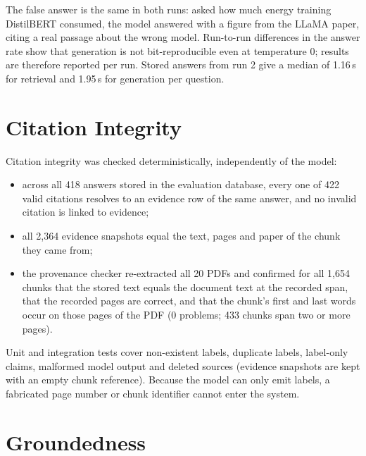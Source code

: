 The false answer is the same in both runs: asked how much energy training DistilBERT consumed, the model answered
with a figure from the LLaMA paper, citing a real passage about the wrong model. Run-to-run differences in the
answer rate show that generation is not bit-reproducible even at temperature 0; results are therefore reported per
run. Stored answers from run 2 give a median of 1.16\,s for retrieval and 1.95\,s for generation per question.

\section{Citation Integrity}

Citation integrity was checked deterministically, independently of the model:
\begin{itemize}
  \item across all 418 answers stored in the evaluation database, every one of 422 valid citations resolves to an
        evidence row of the same answer, and no invalid citation is linked to evidence;
  \item all 2{,}364 evidence snapshots equal the text, pages and paper of the chunk they came from;
  \item the provenance checker re-extracted all 20 PDFs and confirmed for all 1{,}654 chunks that the stored text
        equals the document text at the recorded span, that the recorded pages are correct, and that the chunk's
        first and last words occur on those pages of the PDF (0 problems; 433 chunks span two or more pages).
\end{itemize}
Unit and integration tests cover non-existent labels, duplicate labels, label-only claims, malformed model output
and deleted sources (evidence snapshots are kept with an empty chunk reference). Because the model can only emit
labels, a fabricated page number or chunk identifier cannot enter the system.

\section{Groundedness}

